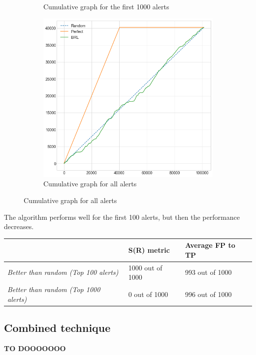 \begin{figure}[H]
\begin{subfigure}{.5\textwidth}
		\caption{Cumulative graph for the first 1000 alerts}\label{}
	\end{subfigure}%
	\begin{subfigure}{.5\textwidth}
		\centering
		\includegraphics[scale=0.3]{./src/brls/brls_cumulative_graph_all.png}
		\caption{Cumulative graph for all alerts}\label{}
	\end{subfigure}  
\end{figure}

The algorithm performs well for the first 100 alerts, but then the performance decreases. 

\begin{table}[H]
	\centering
	\begin{tabular}{@{}lll@{}}
		\toprule
		& \textbf{S(R) metric} & \textbf{Average FP to TP} \\ \midrule
		\textit{Better than random (Top 100 alerts)}  & 1000 out of 1000       & 993 out of 1000           \\
		\textit{Better than random (Top 1000 alerts)} & 0 out of 1000      & 996 out of 1000          \\ \bottomrule
	\end{tabular}
\end{table}


\subsection{Combined technique}
\textbf{TO DOOOOOOO}